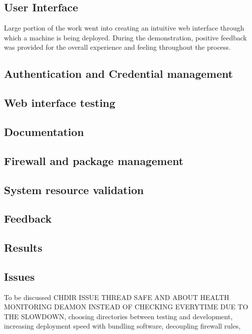 \documentclass{article}
\begin{document}
\subsection{User Interface}
Large portion of the work went into creating an intuitive web interface through which a machine is being deployed. During the demonstration, positive feedback was provided for the overall experience and feeling throughout the process.

\subsection{Authentication and Credential management}

\subsection{Web interface testing}

\subsection{Documentation}

\subsection{Firewall and package management}

\subsection{System resource validation}


\subsection{Feedback}

\subsection{Results}

\subsection{Issues}
{\color{red} 
	To be discussed CHDIR ISSUE THREAD SAFE AND ABOUT HEALTH MONITORING DEAMON INSTEAD OF CHECKING EVERYTIME DUE TO THE SLOWDOWN, choosing directories between testing and development, increasing deployment speed with bundling software, decoupling firewall rules,  
}
\end{document}
